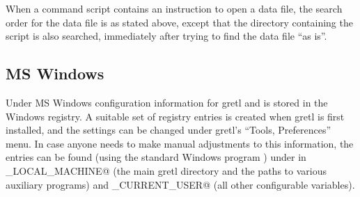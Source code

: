 When a command script contains an instruction to open a data file, the
search order for the data file is as stated above, except that the
directory containing the script is also searched, immediately after
trying to find the data file ``as is''.
      

\subsection{MS Windows}
\label{MS-behave}

Under MS Windows configuration information for gretl and
 is stored in the Windows registry. A suitable set of
registry entries is created when gretl is first installed, and the
settings can be changed under gretl's ``Tools, Preferences'' menu. In
case anyone needs to make manual adjustments to this information, the
entries can be found (using the standard Windows program
) under \verb@Software\gretl@ in
\verb@HKEY_LOCAL_MACHINE@ (the main gretl directory and the paths to
various auxiliary programs) and \verb@HKEY_CURRENT_USER@ (all other
configurable variables).

